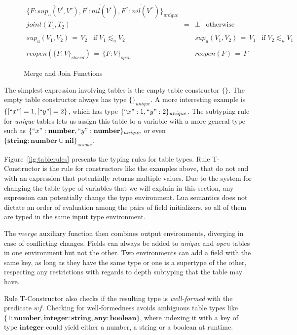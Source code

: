\documentclass[10pt]{sigplanconf}
\newcommand{\Any}{\mathbf{any}}
\newcommand{\Nil}{\mathbf{nil}}
\newcommand{\Boolean}{\mathbf{boolean}}
\newcommand{\Integer}{\mathbf{integer}}
\newcommand{\Number}{\mathbf{number}}
\newcommand{\String}{\mathbf{string}}
\begin{document}
\begin{figure*}
{\[\begin{array}{rcl}
	\{\overline{F:sup_u(V^l,V^r)},\overline{F^\prime:nil(V^\prime)},\overline{F^{\prime\prime}:nil(V^{\prime\prime})}\}_{unique}\\
	joint(T_1, T_2) & = & \bot \;\;\; \mathrm{otherwise}\\\\
	sup_u(V_1, V_2) \,=\, V_2 \;\;\; \mathrm{if}\; V_1 \lesssim_u V_2 & &
	   sup_u(V_1, V_2) \,=\, V_1 \;\;\; \mathrm{if}\; V_2 \lesssim_u V_1 \\
	\\
	reopen(\{\overline{F:V}\}_{closed}) \,=\, \{\overline{F:V}\}_{open} & &
	  reopen(F) \,=\, F\end{array}
\]}
\caption{Merge and Join Functions}
\label{fig:mergejoin}
\end{figure*}

The simplest expression involving tables is the empty
table constructor $\{\}$. The empty table constructor always
has type $\{\}_{unique}$. A more interesting example is $\{ [``x"] = 1, [``y"] = 2 \}$, which has type $\{ ``x":1 , ``y": 2 \}_{unique}$. The subtyping rule for {\em unique} tables lets
us assign this table to a variable with a more general
type such as $\{ ``x":\Number , ``y": \Number \}_{unique}$ or
even $\{ \String:\Number \cup \Nil \}_{unique}$. 

Figure~\ref{fig:tablerules} presents the typing rules for table types.
Rule {\sc T-Constructor} is the rule for constructors
like the examples above, that
do not end with an expression that potentially returns
multiple values.
Due to the system for changing the table type of variables that
we will explain in this section, any expression can potentially
change the type environment. Lua semantics does not dictate
an order of evaluation among the pairs of field initializers,
so all of them are typed in the same input type environment.

The $merge$ auxiliary function then combines output
environments, diverging in case of conflicting changes.
Fields can always be added to {\em unique} and {\em open}
tables in one environment but not the other. Two environments
can add a field with the same key, as long as they have
the same type or one is a supertype of the other, respecting
any restrictions with regards to depth subtyping that the table may have.  

Rule {\sc T-Constructor} also checks if the resulting type is {\em well-formed} with the predicate $wf$. Checking for well-formedness avoids ambiguous table types like
$\{1:\Number, \Integer:\String, \Any:\Boolean\}$,
where indexing it with a key of type $\Integer$ could
yield either a number, a string or a boolean at runtime.
\end{document}
